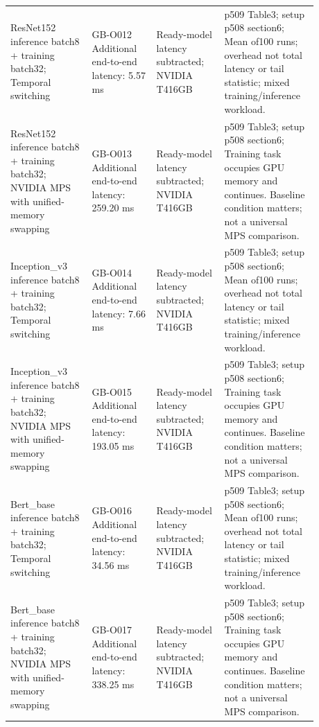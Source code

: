 \documentclass[12pt,a4paper]{article}
\begin{document}
\begin{longtable}{p{0.24\linewidth}p{0.19\linewidth}p{0.2\linewidth}p{0.25\linewidth}}
ResNet152 inference batch8 + training batch32; Temporal switching & GB-O012 Additional end-to-end latency: 5.57 ms & Ready-model latency subtracted; NVIDIA T416GB & p509 Table3; setup p508 section6; Mean of100 runs; overhead not total latency or tail statistic; mixed training/\allowbreak{}inference workload.\\
ResNet152 inference batch8 + training batch32; NVIDIA MPS with unified-memory swapping & GB-O013 Additional end-to-end latency: 259.20 ms & Ready-model latency subtracted; NVIDIA T416GB & p509 Table3; setup p508 section6; Training task occupies GPU memory and continues. Baseline condition matters; not a universal MPS comparison.\\
Inception\_v3 inference batch8 + training batch32; Temporal switching & GB-O014 Additional end-to-end latency: 7.66 ms & Ready-model latency subtracted; NVIDIA T416GB & p509 Table3; setup p508 section6; Mean of100 runs; overhead not total latency or tail statistic; mixed training/\allowbreak{}inference workload.\\
Inception\_v3 inference batch8 + training batch32; NVIDIA MPS with unified-memory swapping & GB-O015 Additional end-to-end latency: 193.05 ms & Ready-model latency subtracted; NVIDIA T416GB & p509 Table3; setup p508 section6; Training task occupies GPU memory and continues. Baseline condition matters; not a universal MPS comparison.\\
Bert\_base inference batch8 + training batch32; Temporal switching & GB-O016 Additional end-to-end latency: 34.56 ms & Ready-model latency subtracted; NVIDIA T416GB & p509 Table3; setup p508 section6; Mean of100 runs; overhead not total latency or tail statistic; mixed training/\allowbreak{}inference workload.\\
Bert\_base inference batch8 + training batch32; NVIDIA MPS with unified-memory swapping & GB-O017 Additional end-to-end latency: 338.25 ms & Ready-model latency subtracted; NVIDIA T416GB & p509 Table3; setup p508 section6; Training task occupies GPU memory and continues. Baseline condition matters; not a universal MPS comparison.\\
\bottomrule
\end{longtable}
\end{document}
